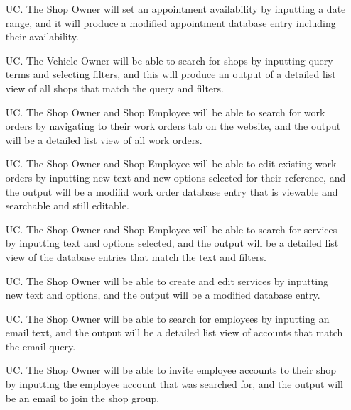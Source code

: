 \documentclass[12pt]{article}
\newcounter{usecasenum} %
\begin{document}
\begin{itemize}
    \item[UC\refstepcounter{usecasenum}\theusecasenum \label{R_Output}.] The Shop Owner will set an appointment availability by inputting a date range, and it will produce a modified appointment database entry including their availability.
    
     \item[UC\refstepcounter{usecasenum}\theusecasenum \label{R_Output}.] The Vehicle Owner will be able to search for shops by inputting query terms and selecting filters, and this will produce an output of a detailed list view of all shops that match the query and filters.
     
     \item[UC\refstepcounter{usecasenum}\theusecasenum \label{R_Output}.] The Shop Owner and Shop Employee will be able to search for work orders by navigating to their work orders tab on the website, and the output will be a detailed list view of all work orders.
     
      \item[UC\refstepcounter{usecasenum}\theusecasenum \label{R_Output}.] The Shop Owner and Shop Employee will be able to edit existing work orders by inputting new text and new options selected for their reference, and the output will be a modifid work order database entry that is viewable and searchable and still editable.
      
      \item[UC\refstepcounter{usecasenum}\theusecasenum \label{R_Output}.] The Shop Owner and Shop Employee will be able to search for services by inputting text and options selected, and the output will be a detailed list view of the database entries that match the text and filters.
      
      \item[UC\refstepcounter{usecasenum}\theusecasenum \label{R_Output}.] The Shop Owner will be able to create and edit services by inputting new text and options, and the output will be a modified database entry.
      
      \item[UC\refstepcounter{usecasenum}\theusecasenum \label{R_Output}.] The Shop Owner will be able to search for employees by inputting an email text, and the output will be a detailed list view of accounts that match the email query.
      
      \item[UC\refstepcounter{usecasenum}\theusecasenum \label{R_Output}.] The Shop Owner will be able to invite employee accounts to their shop by inputting the employee account that was searched for, and the output will be an email to join the shop group.


\end{itemize}
\end{document}
